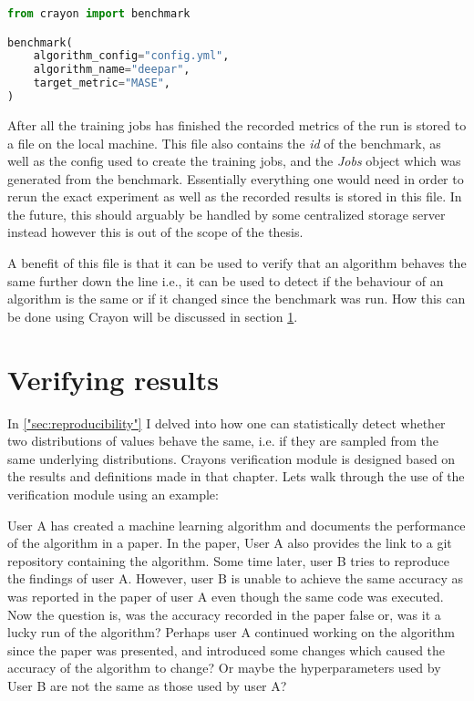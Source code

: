 \begin{lstlisting}[language=Python, label={code:benchmarking}, caption=Python script for starting a benchmarking run using Crayon.]
from crayon import benchmark

benchmark(
    algorithm_config="config.yml",
    algorithm_name="deepar",
    target_metric="MASE",
)
\end{lstlisting}

After all the training jobs has finished the recorded metrics of the run is stored to a file on the local machine. This file also contains the \textit{id} of the benchmark, as well as the config used to create the training jobs, and the \textit{Jobs} object which was generated from the benchmark. Essentially everything one would need in order to rerun the exact experiment as well as the recorded results is stored in this file. In the future, this should arguably be handled by some centralized storage server instead however this is out of the scope of the thesis.

A benefit of this file is that it can be used to verify that an algorithm behaves the same further down the line i.e., it can be used to detect if the behaviour of an algorithm is the same or if it changed since the benchmark was run. How this can be done using Crayon will be discussed in section \ref{subsec:verifying_results}.

\section{Verifying results}
\label{subsec:verifying_results}
In \ref{"sec:reproducibility"} I delved into how one can statistically detect whether two distributions of values behave the same, i.e. if they are sampled from the same underlying distributions. Crayons verification module is designed based on the results and definitions made in that chapter. Lets walk through the use of the verification module using an example:

User A has created a machine learning algorithm and documents the performance of the algorithm in a paper. In the paper, User A also provides the link to a git repository containing the algorithm. Some time later, user B tries to reproduce the findings of user A. However, user B is unable to achieve the same accuracy as was reported in the paper of user A even though the same code was executed. Now the question is, was the accuracy recorded in the paper false or, was it a lucky run of the algorithm? Perhaps user A continued working on the algorithm since the paper was presented, and introduced some changes which caused the accuracy of the algorithm to change? Or maybe the hyperparameters used by User B are not the same as those used by user A?

